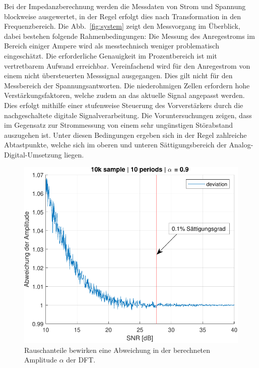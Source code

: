 \smallskip
Bei der Impedanzberechnung werden die Messdaten von Strom und Spannung blockweise ausgewertet, in der Regel erfolgt dies nach Transformation in den Frequenzbereich. Die Abb.~\ref{fig:system} zeigt den Messvorgang im Überblick, dabei bestehen folgende Rahmenbedingungen: Die Messung des Anregestroms im Bereich einiger Ampere wird als messtechnisch weniger problematisch eingeschätzt. Die erforderliche Genauigkeit im Prozentbereich ist mit vertretbarem Aufwand erreichbar. Vereinfachend wird für den Anregestrom von einem nicht übersteuerten Messsignal ausgegangen. Dies gilt nicht für den Messbereich der Spannungsantworten. Die niederohmigen Zellen erfordern hohe Verstärkungsfaktoren, welche zudem an das aktuelle Signal angepasst werden. Dies erfolgt mithilfe einer stufenweise Steuerung des Vorverstärkers durch die nachgeschaltete digitale Signalverarbeitung. Die Voruntersuchungen zeigen, dass im Gegensatz zur Strommessung von einem sehr ungünstigen Störabstand auszugehen ist. Unter diesen Bedingungen ergeben sich in der Regel zahlreiche Abtastpunkte, welche sich im oberen und unteren Sättigungsbereich der Analog-Digital-Umsetzung liegen.

\begin{figure}[t!] 
	\centering
	\includegraphics[width=1\columnwidth]{../img/noise-err.pdf}
	\caption{Rauschanteile bewirken eine Abweichung in der berechneten Amplitude $\alpha$ der DFT.}
	\label{fig:Rauschanteil}
\end{figure}


